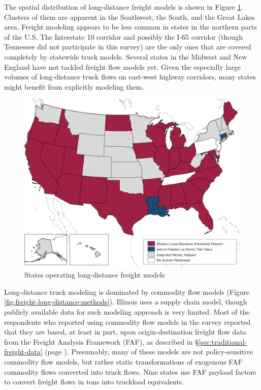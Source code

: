 The spatial distribution of long-distance freight models is shown in Figure \ref{fig:freight-long-distance-states}. Clusters of them are apparent in the Southwest, the South, and the Great Lakes area. Freight modeling appears to be less common in states in the northern parts of the U.S. The Interstate 10 corridor and possibly the I-65 corridor (though Tennessee did not participate in this survey) are the only ones that are covered completely by statewide truck models. Several states in the Midwest and New England have not tackled freight flow models yet. Given the especially large volumes of long-distance truck flows on east-west highway corridors, many states might benefit from explicitly modeling them.

\begin{figure}   %
\centering
\includegraphics[width=6.5in]{graphics/23-freight-long-distance-states}
\caption{States operating long-distance freight models}
\label{fig:freight-long-distance-states}
\end{figure}

Long-distance truck modeling is dominated by commodity flow models (Figure \ref{fig:freight-long-distance-methods}). Illinois uses a supply chain model, though publicly available data for such modeling approach is very limited. Most of the respondents who reported using commodity flow models in the survey reported that they are based, at least in part, upon origin-destination freight flow data from the Freight Analysis Framework (FAF), as described in \S\ref{sec:traditional-freight-data} (page \pageref{sec:traditional-freight-data}). Presumably, many of these models are not policy-sensitive commodity flow models, but rather static transformations of exogenous FAF commodity flows converted into truck flows. Nine states use FAF payload factors to convert freight flows in tons into truckload equivalents.

